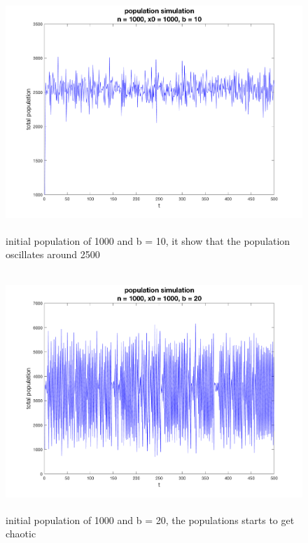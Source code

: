 \documentclass[12pt]{article}
\begin{document}
\begin{figure}[H] %
\centering
\includegraphics[width = 12 cm, height = 9cm]{single_run n1000 x01000 b10.png}
\caption{initial population of 1000 and b = 10, it show that the population oscillates around 2500}
\label{fig:p1s6}
\end{figure}

\begin{figure}[H] %
\centering
\includegraphics[width = 12 cm, height = 9cm]{single_run n1000 x01000 b20.png}
\caption{initial population of 1000 and b = 20, the populations starts to get chaotic}
\label{fig:p1s7}
\end{figure}
\end{document}
